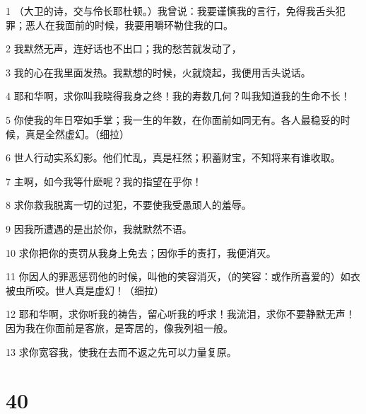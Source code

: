 \par 1 （大卫的诗，交与伶长耶杜顿。）我曾说：我要谨慎我的言行，免得我舌头犯罪；恶人在我面前的时候，我要用嚼环勒住我的口。
\par 2 我默然无声，连好话也不出口；我的愁苦就发动了，
\par 3 我的心在我里面发热。我默想的时候，火就烧起，我便用舌头说话。
\par 4 耶和华啊，求你叫我晓得我身之终！我的寿数几何？叫我知道我的生命不长！
\par 5 你使我的年日窄如手掌；我一生的年数，在你面前如同无有。各人最稳妥的时候，真是全然虚幻。（细拉）
\par 6 世人行动实系幻影。他们忙乱，真是枉然；积蓄财宝，不知将来有谁收取。
\par 7 主啊，如今我等什麽呢？我的指望在乎你！
\par 8 求你救我脱离一切的过犯，不要使我受愚顽人的羞辱。
\par 9 因我所遭遇的是出於你，我就默然不语。
\par 10 求你把你的责罚从我身上免去；因你手的责打，我便消灭。
\par 11 你因人的罪恶惩罚他的时候，叫他的笑容消灭，（的笑容：或作所喜爱的）如衣被虫所咬。世人真是虚幻！（细拉）
\par 12 耶和华啊，求你听我的祷告，留心听我的呼求！我流泪，求你不要静默无声！因为我在你面前是客旅，是寄居的，像我列祖一般。
\par 13 求你宽容我，使我在去而不返之先可以力量复原。

\chapter{40}


